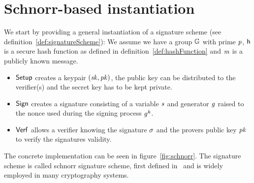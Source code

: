 \section{Schnorr-based instantiation}\label{sec:schnorrInst}

We start by providing a general instantiation of a signature scheme (see definition~\ref{def:signatureScheme}):
We assume we have a group $\mathbb{G}$ with prime $\mathit{p}$, $\mathsf{h}$ is a secure hash function as defined in definition~\ref{def:hashFunction} and $\mathit{m}$ is a publicly known message.

\begin{itemize}
    \item $\mathsf{Setup}$ creates a keypair $(\mathit{sk}, \mathit{pk})$, the public key can be distributed to the verifier(s) and the secret key has to be kept private. \\
    \item $\mathsf{Sign}$ creates a signature consisting of a variable $\mathit{s}$ and generator $\mathit{g}$ raised to the nonce used during the signing process $\mathit{g}^{\mathit{k}}$.
    \item $\mathsf{Verf}$ allows a verifier knowing the signature $\sigma$ and the provers public key $\mathit{pk}$ to verify the signatures validity. \\
\end{itemize}
The concrete implementation can be seen in figure~\ref{fig:schnorr}. The signature scheme is called schnorr signature scheme, first defined in~\cite{schnorr1989efficient} and is widely employed in many cryptography systems.
